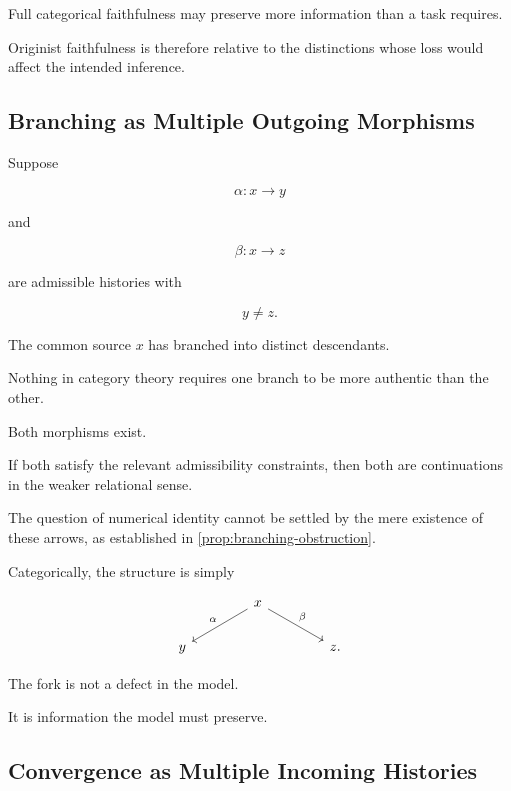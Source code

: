 \documentclass[
  11pt,
  a4paper,
  DIV=12,
  BCOR=0mm,
  parskip=half-
]{scrartcl}
\theoremstyle{definition}
\theoremstyle{plain}
\theoremstyle{remark}
\begin{document}
Full categorical faithfulness may preserve more information than a task
requires.

Originist faithfulness is therefore relative to the distinctions whose loss
would affect the intended inference.


\subsection{Branching as Multiple Outgoing Morphisms}
\label{app:categorical-branching}

Suppose

\[
  \alpha:x\to y
\]

and

\[
  \beta:x\to z
\]

are admissible histories with

\[
  y\neq z.
\]

The common source \(x\) has branched into distinct descendants.

Nothing in category theory requires one branch to be more authentic than the
other.

Both morphisms exist.

If both satisfy the relevant admissibility constraints, then both are
continuations in the weaker relational sense.

The question of numerical identity cannot be settled by the mere existence of
these arrows, as established in \cref{prop:branching-obstruction}.

Categorically, the structure is simply

\[
\begin{tikzcd}[column sep=4em,row sep=2em]
& x \arrow[dl,"\alpha"'] \arrow[dr,"\beta"] & \\
y && z.
\end{tikzcd}
\]

The fork is not a defect in the model.

It is information the model must preserve.


\subsection{Convergence as Multiple Incoming Histories}
\label{app:categorical-convergence}
\end{document}
